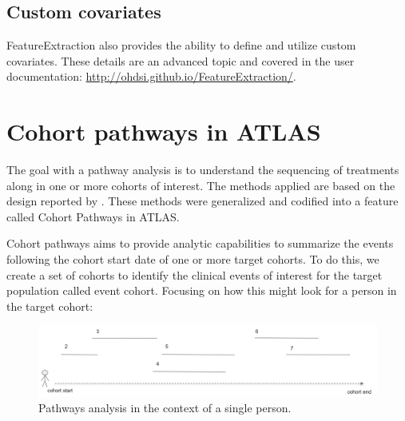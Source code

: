 \documentclass[11pt]{book}
\newenvironment{Shaded}{\begin{snugshade}}{\end{snugshade}}
\newcommand{\NormalTok}[1]{#1}
\newcommand{\OperatorTok}[1]{\textcolor[rgb]{0.81,0.36,0.00}{\textbf{#1}}}
\theoremstyle{definition}
\theoremstyle{definition}
\theoremstyle{definition}
\theoremstyle{remark}
\begin{document}
\begin{Shaded}
\end{Shaded}

\hypertarget{custom-covariates}{%
\subsection{Custom covariates}\label{custom-covariates}}

FeatureExtraction also provides the ability to define and utilize custom covariates. These details are an advanced topic and covered in the user documentation: \url{http://ohdsi.github.io/FeatureExtraction/}.

\hypertarget{cohort-pathways-in-atlas}{%
\section{Cohort pathways in ATLAS}\label{cohort-pathways-in-atlas}}

The goal with a pathway analysis is to understand the sequencing of treatments along in one or more cohorts of interest. The methods applied are based on the design reported by \citet{Hripcsak7329}. These methods were generalized and codified into a feature called Cohort Pathways in ATLAS.

Cohort pathways aims to provide analytic capabilities to summarize the events following the cohort start date of one or more target cohorts. To do this, we create a set of cohorts to identify the clinical events of interest for the target population called event cohort. Focusing on how this might look for a person in the target cohort:

\begin{figure}

{\centering \includegraphics[width=1\linewidth]{images/Characterization/pathwaysPersonEventView} 

}

\caption{Pathways analysis in the context of a single person.}\label{fig:pathwaysPersonEventView}
\end{figure}
\end{document}
